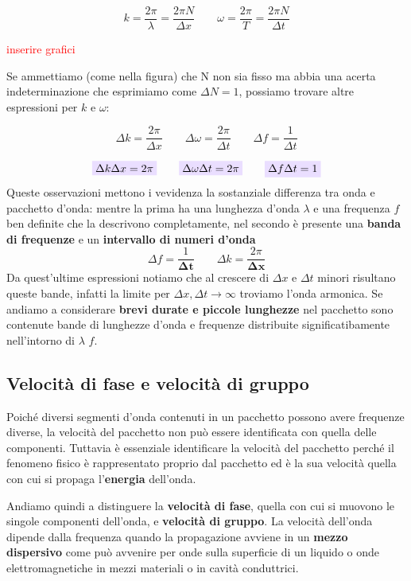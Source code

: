 \documentclass[x11names]{report}
\newcommand{\viola}[1]{\colorbox{yred}{$\displaystyle #1$}}
\begin{document}
	\[ 
	k = \frac{2\pi}{\lambda}= \frac{2\pi N}{\Delta x} \qquad \omega = \frac{2\pi}{T} = \frac{2\pi N}{\Delta t}
	\]
	
	\begin{center}
		\textcolor{red}{inserire grafici}
	\end{center}
	Se ammettiamo (come nella figura) che N non sia fisso ma abbia una acerta indeterminazione che esprimiamo come \(\Delta N = 1\), possiamo trovare altre espressioni per \(k\) e \(\omega\):
	
	\[ 
	\boxed{\Delta k = \frac{2\pi}{\Delta x}} \qquad \boxed{ \Delta\omega = \frac{2\pi}{\Delta t}} \qquad \boxed{\Delta f = \frac{1}{\Delta t}}
	\]
	
	\[ 
	\viola{\Delta k \Delta x = 2\pi} \qquad \viola{\Delta \omega \Delta t = 2\pi} \qquad \viola{\Delta f \Delta t = 1}
	\]
	Queste osservazioni mettono i vevidenza la sostanziale differenza tra onda e pacchetto d'onda: mentre la prima ha una lunghezza d'onda \(\lambda\)  e una frequenza \(f\) ben definite che la descrivono completamente, nel secondo è presente una \textbf{banda di frequenze} e un \textbf{intervallo di numeri d'onda}
	\[ 
	\Delta f = \frac{1}{\boldsymbol{\Delta t}} \qquad \Delta k = \frac{2\pi}{\boldsymbol{\Delta x}}
	\]
	Da quest'ultime espressioni notiamo che al crescere di \(\Delta x\) e \(\Delta t\) minori risultano queste bande, infatti la limite per \(\Delta x,\Delta t \to \infty\) troviamo l'onda armonica. Se andiamo a considerare \textbf{brevi durate e piccole lunghezze} nel pacchetto sono contenute bande di lunghezze d'onda e frequenze distribuite significatibamente nell'intorno di \(\lambda\) \(f\).
	
	\subsection{Velocità di fase e velocità di gruppo}
	Poiché diversi segmenti d'onda contenuti in un pacchetto possono avere frequenze diverse, la velocità del pacchetto non può essere identificata con quella delle componenti. Tuttavia è essenziale identificare la velocità del pacchetto perché il fenomeno fisico è rappresentato proprio dal pacchetto ed è la sua velocità quella con cui si propaga l'\textbf{energia} dell'onda.     
	
	Andiamo quindi a distinguere la \textbf{velocità di fase}, quella con cui si muovono le singole componenti dell'onda, e \textbf{velocità di gruppo}. 
	La velocità dell'onda dipende dalla frequenza quando la propagazione avviene in un \textbf{mezzo dispersivo} come può avvenire per onde sulla superficie di un liquido o onde elettromagnetiche in mezzi materiali o in cavità conduttrici.\\
	
\end{document}
